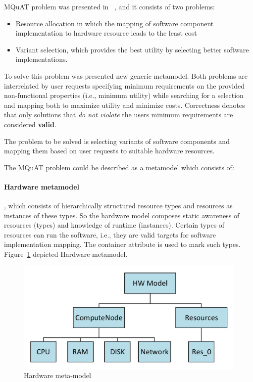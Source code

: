 MQuAT problem was presented in ~\cite{gotz18}, and it consists of two problems:

\begin{itemize}
	\item Resource allocation in which the mapping of software component implementation to hardware resource leads to the least cost
	\item Variant selection, which provides the best utility by selecting better software implementations.
\end{itemize} 

To solve this problem was presented new generic metamodel. Both problems are interrelated by user requests specifying minimum requirements on the provided non-functional properties (i.e., minimum utility) while searching for a selection and mapping both to maximize utility and minimize costs. Correctness denotes that only solutions that \textit{do not violate} the users minimum requirements are considered \textbf{valid}.

The problem to be solved is selecting variants of software components and mapping them based on user requests to suitable hardware resources.

The MQuAT problem could be described as a metamodel which consists of:
\paragraph{Hardware metamodel}, which consists of hierarchically structured resource types and resources as instances of these types. So the hardware model composes static awareness of resources (types) and knowledge of runtime (instances). Certain types of resources can run the software, i.e., they are valid targets for software implementation mapping. The container attribute is used to mark such types. Figure~\ref{fig:HWmodel} depicted Hardware metamodel.

\begin{figure}
	\centering
	\includegraphics[width=\textwidth]{images/HWModel}
	\caption[Hardware meta-model]{Hardware meta-model}
	\label{fig:HWmodel}
\end{figure}



